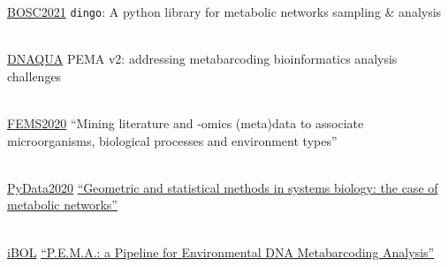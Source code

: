 \documentclass[
	a4paper,
]{fortysecondscv}
\begin{document}
\begin{cvtable}

    	{\href{https://www.open-bio.org/events/bosc-2021/}{BOSC2021}}
	    {\texttt{dingo}: A python library for metabolic networks sampling \& analysis}{}

    \\
    
    	{\href{https://symposium.inrae.fr/dnaqua-conference-evian2021/}{DNAQUA}}
	    {PEMA v2: addressing metabarcoding bioinformatics analysis challenges}{}
	    
	\\

    	{\href{https://fems2020belgrade.com/}{FEMS2020}}
	    {“Mining literature and -omics (meta)data to associate microorganisms, biological processes and environment types”}{}

    \\

    	{\href{https://pydata.org/global2020/}{PyData2020}}
	    {\href{https://www.youtube.com/watch?v=zg8KFZ_LbHM&t=1s}{“Geometric and statistical methods in systems biology: the case of metabolic networks”}}{}

    \\
    
    	{\href{http://dnabarcodes2019.org/}{iBOL}}
    	{\href{}{“P.E.M.A.: a Pipeline for Environmental DNA Metabarcoding Analysis”}}{}

\end{cvtable}
\end{document}
